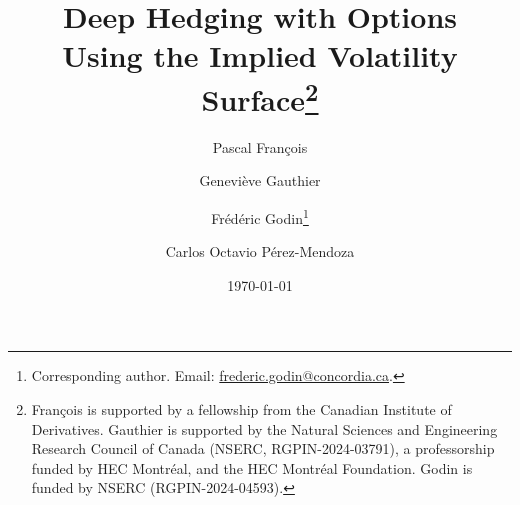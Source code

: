 \documentclass[12pt]{article}
\begin{document}
\title{\vspace{-25pt} \Large \bfseries %
Deep Hedging with Options \\ Using the Implied Volatility Surface\thanks{François is supported by a fellowship from the Canadian Institute of Derivatives. Gauthier is supported by the Natural Sciences and Engineering Research Council of Canada (NSERC, RGPIN-2024-03791), a professorship funded by HEC Montr\'eal, and the HEC Montr\'eal Foundation. Godin is funded by NSERC (RGPIN-2024-04593).}
 } %
\vspace{-5pt}
\author[a]{Pascal Fran\c{c}ois}
\author[b]{Genevi\`eve Gauthier} 
\author[,c]{Fr\'ed\'eric Godin\thanks{Corresponding author. Email:  \href{mailto:frederic.godin@concordia.ca}{frederic.godin@concordia.ca}.}}  
\author[c]{Carlos Octavio P\'erez-Mendoza}  

\renewcommand\Authands{\\} %



\vspace{-10pt}
\date{ %
\today}

\end{document}

